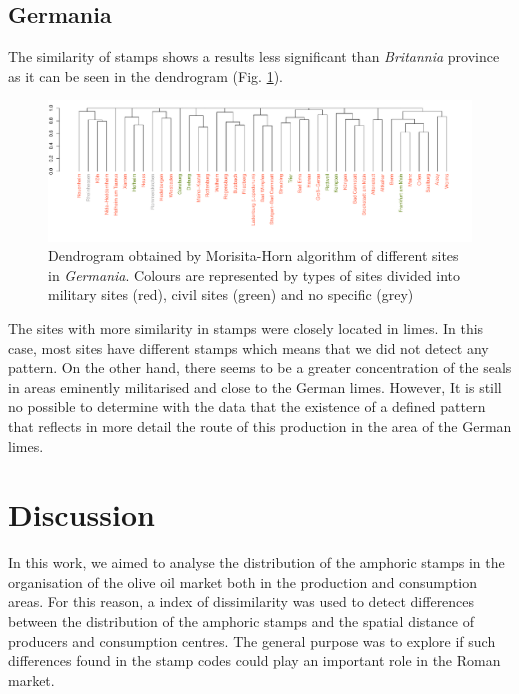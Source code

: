 \documentclass[review]{elsarticle}
\begin{document}
\subsection{Germania}

The similarity of stamps shows a results less significant than \textit{Britannia} province as it can be seen in the dendrogram (Fig. \ref{germap}). 

\begin{figure}[htp]
	\centering
\includegraphics[width=\linewidth]{figs/dendroger5.pdf}
\caption{Dendrogram obtained by Morisita-Horn algorithm of different sites in \textit{Germania}. Colours are represented by types of sites divided into military sites (red), civil sites (green) and no specific (grey)}
\label{germap}
\end{figure}


The sites with more similarity in stamps were closely located in limes. In this case, most sites have different stamps which means that we did not detect any pattern. On the other hand, there seems to be a greater concentration of the seals in areas eminently militarised and close to the German limes. However, It is still no possible to determine with the data that the existence of a defined pattern that reflects in more detail the route of this production in the area of the German limes.


\section{Discussion}


In this work, we aimed to analyse the distribution of the amphoric stamps in the organisation of the olive oil market both in the production and consumption areas. For this reason, a index of dissimilarity was used to detect differences between the distribution of the amphoric stamps and the spatial distance of producers and consumption centres. The general purpose was to explore if such differences found in the stamp codes could play an important role in the Roman market.  
\end{document}
